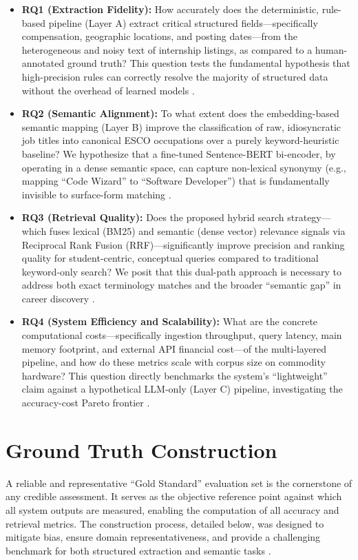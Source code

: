 \begin{itemize}
    \item \textbf{RQ1 (Extraction Fidelity):} How accurately does the deterministic, rule-based pipeline (Layer A) extract critical structured fields---specifically compensation, geographic locations, and posting dates---from the heterogeneous and noisy text of internship listings, as compared to a human-annotated ground truth? This question tests the fundamental hypothesis that high-precision rules can correctly resolve the majority of structured data without the overhead of learned models \cite{sarawagi2008information, nadeau2007survey}.

    \item \textbf{RQ2 (Semantic Alignment):} To what extent does the embedding-based semantic mapping (Layer B) improve the classification of raw, idiosyncratic job titles into canonical ESCO occupations over a purely keyword-heuristic baseline? We hypothesize that a fine-tuned Sentence-BERT bi-encoder, by operating in a dense semantic space, can capture non-lexical synonymy (e.g., mapping ``Code Wizard'' to ``Software Developer'') that is fundamentally invisible to surface-form matching \cite{reimers2019sentence, lin2021pretrained}.

    \item \textbf{RQ3 (Retrieval Quality):} Does the proposed hybrid search strategy---which fuses lexical (BM25) and semantic (dense vector) relevance signals via Reciprocal Rank Fusion (RRF)---significantly improve precision and ranking quality for student-centric, conceptual queries compared to traditional keyword-only search? We posit that this dual-path approach is necessary to address both exact terminology matches and the broader ``semantic gap'' in career discovery \cite{thakur2021beir, luan2021sparse, cormack2009reciprocal}.

    \item \textbf{RQ4 (System Efficiency and Scalability):} What are the concrete computational costs---specifically ingestion throughput, query latency, main memory footprint, and external API financial cost---of the multi-layered pipeline, and how do these metrics scale with corpus size on commodity hardware? This question directly benchmarks the system's ``lightweight'' claim against a hypothetical LLM-only (Layer C) pipeline, investigating the accuracy-cost Pareto frontier \cite{menghani2023efficient, hsieh2023distilling}.
\end{itemize}

\section{Ground Truth Construction}
A reliable and representative ``Gold Standard'' evaluation set is the cornerstone of any credible assessment. It serves as the objective reference point against which all system outputs are measured, enabling the computation of all accuracy and retrieval metrics. The construction process, detailed below, was designed to mitigate bias, ensure domain representativeness, and provide a challenging benchmark for both structured extraction and semantic tasks \cite{buttcher2016information, christen2012data}.

